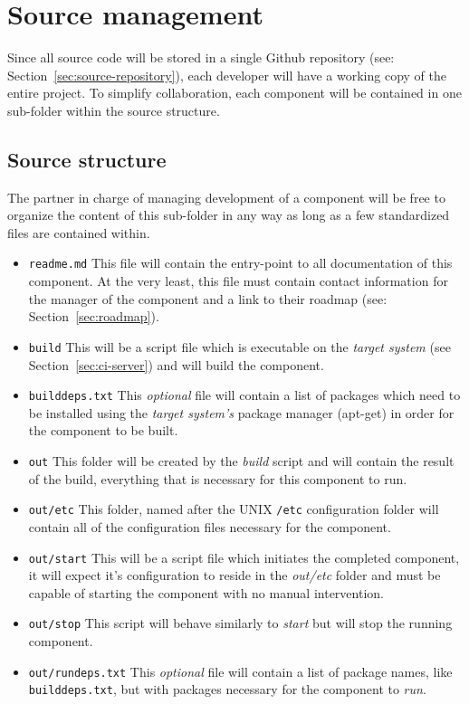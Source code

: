 \documentclass{learnpad}
\begin{document}
\section{Source management}
\label{sec:source-management}

Since all source code will be stored in a single Github repository
(see: Section~\ref{sec:source-repository}), each developer will have a working copy of the entire
project. To simplify collaboration, each component will be contained in one sub-folder within the
source structure.

\subsection{Source structure}
\label{sec:source-structure}
The partner in charge of managing development of a component will be free to organize the content
of this sub-folder in any way as long as a few standardized files are contained within.

\begin{itemize}
\item \texttt{readme.md} This file will contain the entry-point to all documentation of this
component. At the very least, this file must contain contact information for the manager of
the component and a link to their roadmap (see: Section~\ref{sec:roadmap}).
\item \texttt{build} This will be a script file which is executable on the \emph{target system}
(see Section~\ref{sec:ci-server}) and will build the component.
\item \texttt{builddeps.txt} This \emph{optional} file will contain a list of packages which
need to be installed using the \emph{target system's} package manager (apt-get) in order for
the component to be built.
\item \texttt{out} This folder will be created by the \emph{build} script and will contain the
result of the build, everything that is necessary for this component to run.
\item \texttt{out/etc} This folder, named after the UNIX \texttt{/etc} configuration folder will
contain all of the configuration files necessary for the component.
\item \texttt{out/start} This will be a script file which initiates the completed component, it will
expect it's configuration to reside in the \emph{out/etc} folder and must be capable of starting
the component with no manual intervention.
\item \texttt{out/stop} This script will behave similarly to \emph{start} but will stop the running
component.
\item \texttt{out/rundeps.txt} This \emph{optional} file will contain a list of package names,
like \texttt{builddeps.txt}, but with packages necessary for the component to \emph{run}.
\end{itemize}
\end{document}
